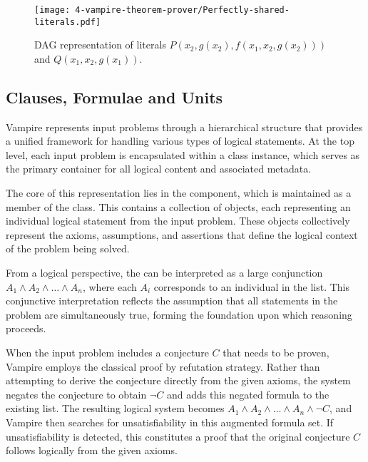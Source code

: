 \begin{figure}[H]
  \centering
  \texttt{[image: 4-vampire-theorem-prover/Perfectly-shared-literals.pdf]}
  \caption{DAG representation of literals \(P(x_2,g(x_2),f(x_1,x_2,g(x_2)))\) and \(Q(x_1,x_2,g(x_1))\).}\label{fig:dag_representation}

\end{figure}

\subsection{Clauses, Formulae and Units}\label{subsec:clauses-formulae-units}


Vampire represents input problems through a hierarchical structure that provides a unified framework for handling various types of logical statements.
At the top level, each input problem is encapsulated within a  class instance, which serves as the primary container for all logical content and associated metadata.

The core of this representation lies in the  component, which is maintained as a member of the  class.
This  contains a collection of  objects, each representing an individual logical statement from the input problem.
These  objects collectively represent the axioms, assumptions, and assertions that define the logical context of the problem being solved.

From a logical perspective, the  can be interpreted as a large conjunction \(A_1 \land A_2 \land \ldots \land A_n\), where each \(A_i\) corresponds to an individual  in the list.
This conjunctive interpretation reflects the assumption that all statements in the problem are simultaneously true, forming the foundation upon which reasoning proceeds.

When the input problem includes a conjecture \(C\) that needs to be proven, Vampire employs the classical proof by refutation strategy.
Rather than attempting to derive the conjecture directly from the given axioms, the system negates the conjecture to obtain \(\neg C\) and adds this negated formula to the existing  list.
The resulting logical system becomes \(A_1 \land A_2 \land \ldots \land A_n \land \neg C\), and Vampire then searches for unsatisfiability in this augmented formula set.
If unsatisfiability is detected, this constitutes a proof that the original conjecture \(C\) follows logically from the given axioms.


